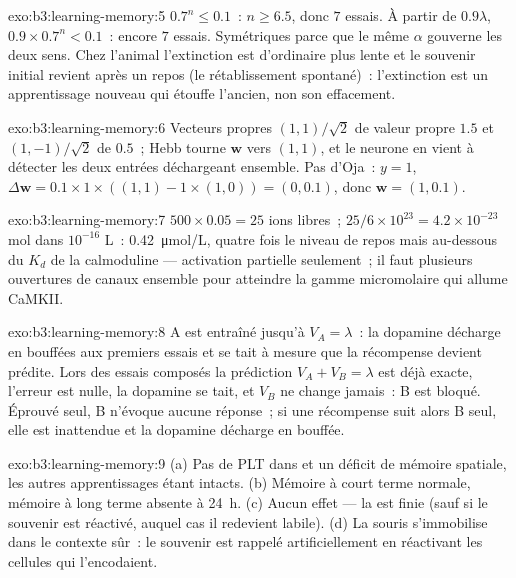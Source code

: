 \begin{solution}{exo:b3:learning-memory:5}
$0.7^{n} \le 0.1$~: $n \ge 6.5$, donc $7$ essais. À partir de
$0.9\lambda$, $0.9\times 0.7^{n} < 0.1$~: encore $7$ essais. Symétriques
parce que le même $\alpha$ gouverne les deux sens. Chez l'animal
l'extinction est d'ordinaire plus lente et le souvenir initial revient
après un repos (le rétablissement spontané)~: l'extinction est un
apprentissage nouveau qui étouffe l'ancien, non son effacement.
\end{solution}

\begin{solution}{exo:b3:learning-memory:6}
Vecteurs propres $(1,1)/\sqrt{2}$ de valeur propre $1.5$ et
$(1,-1)/\sqrt{2}$ de $0.5$~; Hebb tourne $\mathbf{w}$ vers $(1,1)$, et le
neurone en vient à détecter les deux entrées déchargeant ensemble. Pas
d'Oja~: $y = 1$,
$\Delta\mathbf{w} = 0.1\times 1\times((1,1) - 1\times(1,0)) = (0,0.1)$,
donc $\mathbf{w} = (1, 0.1)$.
\end{solution}

\begin{solution}{exo:b3:learning-memory:7}
$500\times 0.05 = 25$ ions libres~; $25/6\times 10^{23} = 4.2\times 10^{-23}$
mol dans $10^{-16}$ L~: \qty{0.42}{\micro mol/L}, quatre fois le niveau
de repos mais au-dessous du $K_{d}$ de la calmoduline --- activation
partielle seulement~; il faut plusieurs ouvertures de canaux ensemble
pour atteindre la gamme micromolaire qui allume CaMKII.
\end{solution}

\begin{solution}{exo:b3:learning-memory:8}
A est entraîné jusqu'à $V_{A} = \lambda$~: la dopamine décharge en
bouffées aux premiers essais et se tait à mesure que la récompense
devient prédite. Lors des essais composés la prédiction
$V_{A} + V_{B} = \lambda$ est déjà exacte, l'erreur est nulle, la
dopamine se tait, et $V_{B}$ ne change jamais~: B est bloqué. Éprouvé
seul, B n'évoque aucune réponse~; si une récompense suit alors B seul,
elle est inattendue et la dopamine décharge en bouffée.
\end{solution}

\begin{solution}{exo:b3:learning-memory:9}
(a) Pas de PLT dans  et un déficit de mémoire spatiale, les autres
apprentissages étant intacts. (b) Mémoire à court terme normale, mémoire
à long terme absente à \qty{24}{h}. (c) Aucun effet --- la 
est finie (sauf si le souvenir est réactivé, auquel cas il redevient
labile). (d) La souris s'immobilise dans le contexte sûr~: le souvenir
est rappelé artificiellement en réactivant les cellules qui l'encodaient.
\end{solution}


